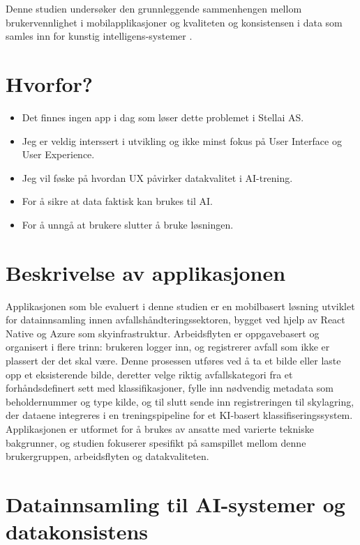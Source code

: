 Denne studien undersøker den grunnleggende sammenhengen mellom brukervennlighet i mobilapplikasjoner og kvaliteten og konsistensen i data som samles inn for kunstig intelligens-systemer \cite{weichbroth2024, wenz2023}.

\section{Hvorfor?} 
\begin{itemize}
    \item Det finnes ingen app i dag som løser dette problemet i Stellai AS.
    \item Jeg er veldig interssert i utvikling og ikke minst fokus på User Interface og User Experience.
    \item Jeg vil føske på hvordan UX påvirker datakvalitet i AI-trening.
    \item For å sikre at data faktisk kan brukes til AI.
    \item For å unngå at brukere slutter å bruke løsningen.
\end{itemize}

\section{Beskrivelse av applikasjonen}

Applikasjonen som ble evaluert i denne studien er en mobilbasert løsning utviklet for datainnsamling innen avfallshåndteringssektoren, bygget ved hjelp av React Native og Azure som skyinfrastruktur. Arbeidsflyten er oppgavebasert og organisert i flere trinn: brukeren logger inn, og registrerer avfall som ikke er plassert der det skal være. Denne prosessen utføres ved å ta et bilde eller laste opp et eksisterende bilde, deretter velge riktig avfallskategori fra et forhåndsdefinert sett med klassifikasjoner, fylle inn nødvendig metadata som beholdernummer og type kilde, og til slutt sende inn registreringen til skylagring, der dataene integreres i en treningspipeline for et KI‑basert klassifiseringssystem. Applikasjonen er utformet for å brukes av ansatte med varierte tekniske bakgrunner, og studien fokuserer spesifikt på samspillet mellom denne brukergruppen, arbeidsflyten og datakvaliteten.

\section{Datainnsamling til AI-systemer og datakonsistens}

